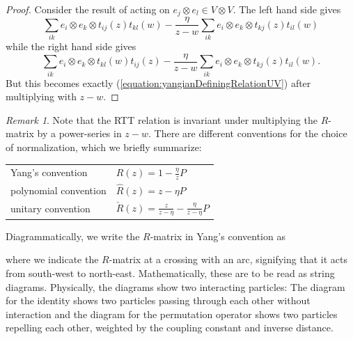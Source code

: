 \documentclass[11pt]{report}
\theoremstyle{definition}
\theoremstyle{remark}
\newtheorem*{remark}{Remark}
\theoremstyle{remark}
\begin{document}
\begin{proof}
Consider the result of acting on $e_j \otimes e_l \in V \otimes V$. The left hand side gives
\begin{equation*}
\sum_{ik} e_i \otimes e_k \otimes t_{ij}(z) t_{kl}(w) - \frac{\eta}{z-w} \sum_{ik} e_i \otimes e_k \otimes t_{kj}(z) t_{il}(w)
\end{equation*}
while the right hand side gives
\begin{equation*}
\sum_{ik} e_i \otimes e_k \otimes t_{kl}(w) t_{ij}(z) - \frac{\eta}{z-w} \sum_{ik} e_i \otimes e_k \otimes t_{kj}(z) t_{il}(w).
\end{equation*}
But this becomes exactly (\ref{equation:yangianDefiningRelationUV}) after multiplying with $z-w$.
\end{proof}

\begin{remark}
Note that the RTT relation is invariant under multiplying the $R$-matrix by a power-series in $z-w$. There are different conventions for the choice of normalization, which we briefly summarize:
\begin{center}
\begin{tabular}{|l||l|}
\hline
Yang's convention & $R(z) = 1 - \frac{\eta}{z} P$ \\
polynomial convention & $\hat R(z) = z - \eta P$ \\
unitary convention & $\check R(z) = \frac{z}{z-\eta} - \frac{\eta}{z-\eta} P$ \\
\hline
\end{tabular}
\end{center}
Diagrammatically, we write the $R$-matrix in Yang's convention as
~\\
\begin{center}
\end{center}
where we indicate the $R$-matrix at a crossing with an arc, signifying that it acts from south-west to north-east. Mathematically, these are to be read as string diagrams. Physically, the diagrams show two interacting particles: The diagram for the identity shows two particles passing through each other without interaction and the diagram for the permutation operator shows two particles repelling each other, weighted by the coupling constant and inverse distance.


\end{remark}
\end{document}
